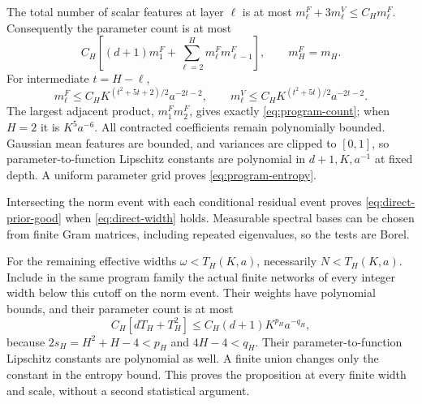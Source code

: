 The total number of scalar features at layer $\ell$ is at most $m_\ell^F+3m_\ell^V\le C_Hm_\ell^F$. Consequently the parameter count is at most
\[
 C_H\left[(d+1)m_1^F+\sum_{\ell=2}^H m_\ell^F m_{\ell-1}^F\right],\qquad m_H^F=m_H.
\]
For intermediate $t=H-\ell$,
\[
 m_\ell^F\le C_HK^{(t^2+5t+2)/2}a^{-2t-2},\qquad
 m_\ell^V\le C_HK^{(t^2+5t)/2}a^{-2t-2}.
\]
The largest adjacent product, $m_1^Fm_2^F$, gives exactly \eqref{eq:program-count}; when $H=2$ it is $K^5a^{-6}$. All contracted coefficients remain polynomially bounded. Gaussian mean features are bounded, and variances are clipped to $[0,1]$, so parameter-to-function Lipschitz constants are polynomial in $d+1,K,a^{-1}$ at fixed depth. A uniform parameter grid proves \eqref{eq:program-entropy}.

Intersecting the norm event with each conditional residual event proves \eqref{eq:direct-prior-good} when \eqref{eq:direct-width} holds. Measurable spectral bases can be chosen from finite Gram matrices, including repeated eigenvalues, so the tests are Borel.

For the remaining effective widths $\omega<T_H(K,a)$, necessarily $N<T_H(K,a)$. Include in the same program family the actual finite networks of every integer width below this cutoff on the norm event. Their weights have polynomial bounds, and their parameter count is at most
\[
 C_H[dT_H+T_H^2]\le C_H(d+1)K^{p_H}a^{-q_H},
\]
because $2s_H=H^2+H-4<p_H$ and $4H-4<q_H$. Their parameter-to-function Lipschitz constants are polynomial as well. A finite union changes only the constant in the entropy bound. This proves the proposition at every finite width and scale, without a second statistical argument.
